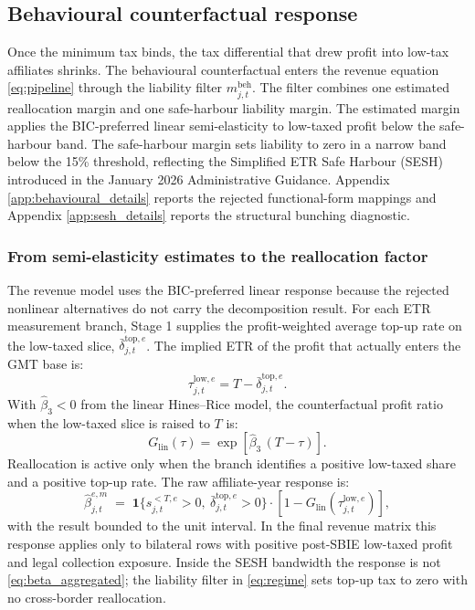 \documentclass[11pt,a4paper]{article}
\begin{document}
\subsection{Behavioural counterfactual response}\label{sec:behavioural}

Once the minimum tax binds, the tax differential that drew profit into low-tax affiliates shrinks. The behavioural counterfactual enters the revenue equation \eqref{eq:pipeline} through the liability filter $m_{j,t}^{\text{beh}}$. The filter combines one estimated reallocation margin and one safe-harbour liability margin. The estimated margin applies the BIC-preferred linear semi-elasticity to low-taxed profit below the safe-harbour band. The safe-harbour margin sets liability to zero in a narrow band below the 15\% threshold, reflecting the Simplified ETR Safe Harbour (SESH) introduced in the January 2026 Administrative Guidance. Appendix \ref{app:behavioural_details} reports the rejected functional-form mappings and Appendix \ref{app:sesh_details} reports the structural bunching diagnostic.


\subsubsection{From semi-elasticity estimates to the reallocation factor}\label{sec:reallocation_mapping}

The revenue model uses the BIC-preferred linear response because the rejected nonlinear alternatives do not carry the decomposition result. For each ETR measurement branch, Stage 1 supplies the profit-weighted average top-up rate on the low-taxed slice, $\bar{\delta}_{j,t}^{\text{top},e}$. The implied ETR of the profit that actually enters the GMT base is:
\begin{equation}\label{eq:tau_low_segment}
\tau_{j,t}^{\text{low},e} = T - \bar{\delta}_{j,t}^{\text{top},e}.
\end{equation}
With $\hat{\beta}_3<0$ from the linear Hines--Rice model, the counterfactual profit ratio when the low-taxed slice is raised to $T$ is:
\begin{equation}\label{eq:cf_linear}
G_{\text{lin}}(\tau) = \exp\!\left[\hat{\beta}_3\,(T-\tau)\right].
\end{equation}
Reallocation is active only when the branch identifies a positive low-taxed share and a positive top-up rate. The raw affiliate-year response is:
\begin{equation}\label{eq:beta_aggregated}
\hat{\beta}_{j,t}^{e,m}
\;=\;
\mathbf{1}\{s_{j,t}^{<T,e}>0,\ \bar{\delta}_{j,t}^{\text{top},e}>0\}
\cdot \left[1-G_{\text{lin}}\!\left(\tau_{j,t}^{\text{low},e}\right)\right],
\end{equation}
with the result bounded to the unit interval. In the final revenue matrix this response applies only to bilateral rows with positive post-SBIE low-taxed profit and legal collection exposure. Inside the SESH bandwidth the response is not \eqref{eq:beta_aggregated}; the liability filter in \eqref{eq:regime} sets top-up tax to zero with no cross-border reallocation.
\end{document}
